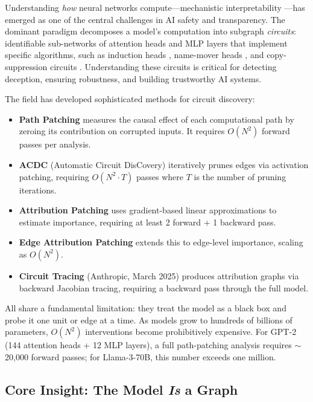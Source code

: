 \documentclass[11pt,a4paper]{article}
\begin{document}
Understanding \emph{how} neural networks compute---mechanistic interpretability \cite{olah2020zoom,elhage2021mathematical,bereska2024mechanistic}---has emerged as one of the central challenges in AI safety and transparency. The dominant paradigm decomposes a model's computation into subgraph \emph{circuits}: identifiable sub-networks of attention heads and MLP layers that implement specific algorithms, such as induction heads \cite{olsson2022incontext}, name-mover heads \cite{wang2023interpretability}, and copy-suppression circuits \cite{mcdougall2023copy}. Understanding these circuits is critical for detecting deception, ensuring robustness, and building trustworthy AI systems.

The field has developed sophisticated methods for circuit discovery:
\begin{itemize}[leftmargin=*]
    \item \textbf{Path Patching} \cite{goldowsky2023localizing,wang2023interpretability} measures the causal effect of each computational path by zeroing its contribution on corrupted inputs. It requires $O(N^2)$ forward passes per analysis.
    \item \textbf{ACDC} (Automatic Circuit DisCovery) \cite{conmy2023automated} iteratively prunes edges via activation patching, requiring $O(N^2 \cdot T)$ passes where $T$ is the number of pruning iterations.
    \item \textbf{Attribution Patching} \cite{nanda2023attribution,syed2023attribution} uses gradient-based linear approximations to estimate importance, requiring at least 2 forward + 1 backward pass.
    \item \textbf{Edge Attribution Patching} \cite{nanda2023edge} extends this to edge-level importance, scaling as $O(N^2)$.
    \item \textbf{Circuit Tracing} \cite{anthropic2025circuit} (Anthropic, March 2025) produces attribution graphs via backward Jacobian tracing, requiring a backward pass through the full model.
\end{itemize}

All share a fundamental limitation: they treat the model as a black box and probe it one unit or edge at a time. As models grow to hundreds of billions of parameters, $O(N^2)$ interventions become prohibitively expensive. For GPT-2 (144 attention heads + 12 MLP layers), a full path-patching analysis requires $\sim$20,000 forward passes; for Llama-3-70B, this number exceeds one million.

\subsection{Core Insight: The Model \emph{Is} a Graph}
\end{document}
